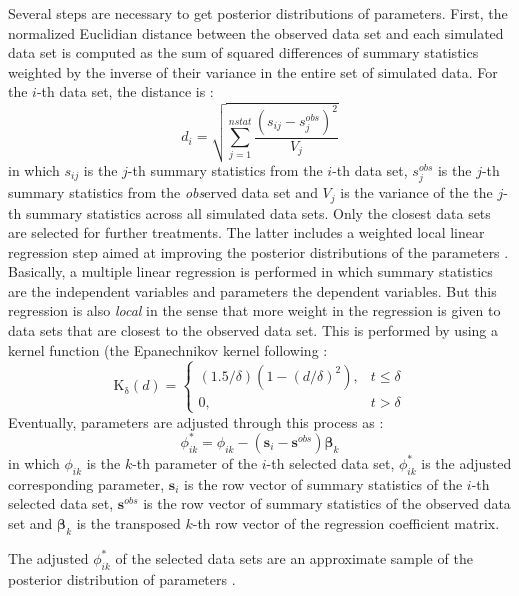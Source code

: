 Several steps are necessary to get posterior distributions of parameters.
First, the normalized Euclidian distance between the observed data
set and each simulated data set is computed as the sum of squared
differences of summary statistics weighted by the inverse of their
variance in the entire set of simulated data. For the $i$-th data
set, the distance is :
\begin{equation}
d_{i}=\sqrt{\sum_{j=1}^{nstat}\frac{(s_{ij}-s_{j}^{obs})^{2}}{V_{j}}}\label{eq1}
\end{equation}
in which $s_{ij}$ is the $j$-th summary statistics from the $i$-th
data set, $s_{j}^{obs}$ is the $j$-th summary statistics from the
\emph{obs}erved data set and $V_{j}$ is the variance of the the $j$-th
summary statistics across all simulated data sets. Only the closest
data sets are selected for further treatments. The latter includes
a weighted local linear regression step aimed at improving the posterior
distributions of the parameters \citep{B2002}. Basically, a multiple
linear regression is performed in which summary statistics are the
independent variables and parameters the dependent variables. But
this regression is also \emph{local} in the sense that more weight
in the regression is given to data sets that are closest to the observed
data set. This is performed by using a kernel function (the Epanechnikov
kernel following \citet{B2002} :
\begin{equation}
\operatorname{K_{\delta}}(d)=\left\{ \begin{array}{ll}
(1.5/\delta)(1-(d/\delta)^{2}), & t\leq\delta\\
0, & t>\delta
\end{array}\right.
\end{equation}
Eventually, parameters are adjusted through this process as :
\begin{equation}
\phi_{ik}^{*}=\phi_{ik}-(\textbf{s}_{i}-\textbf{s}^{obs})\bm{\beta}_{k}\label{eq2}
\end{equation}
in which $\phi_{ik}$ is the $k$-th parameter of the $i$-th selected
data set, $\phi_{ik}^{*}$ is the adjusted corresponding parameter,
$\textbf{s}_{i}$ is the row vector of summary statistics of the $i$-th
selected data set, $\textbf{s}^{obs}$ is the row vector of summary
statistics of the observed data set and $\bm{\beta}_{k}$ is the transposed
$k$-th row vector of the regression coefficient matrix.

The adjusted $\phi_{ik}^{*}$ of the selected data sets are an approximate
sample of the posterior distribution of parameters \citep{B2002}.


